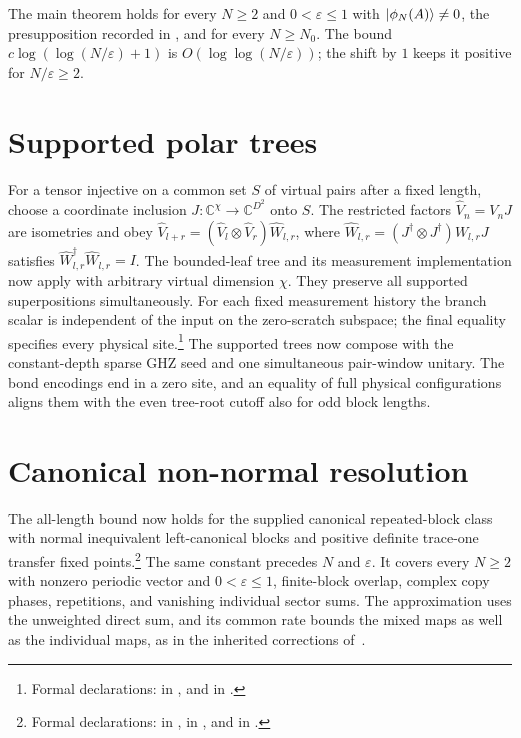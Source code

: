 \documentclass{article}
\begin{document}
The main theorem holds for every $N\ge2$ and $0<\varepsilon\le1$ with
$|\phi_N(A)\rangle\neq0$, the presupposition recorded in
, and for every
$N\ge N_0$.
The bound $c\log(\log(N/\varepsilon)+1)$ is $O(\log\log(N/\varepsilon))$; the
shift by $1$ keeps it positive for $N/\varepsilon\ge2$.

\section{Supported polar trees}
For a tensor injective on a common set $S$ of virtual pairs after a fixed
length, choose a coordinate inclusion $J\colon\mathbb C^\chi\to\mathbb C^{D^2}$
onto $S$. The restricted factors $\widehat V_n=V_nJ$ are isometries and obey
$\widehat V_{l+r}=(\widehat V_l\otimes\widehat V_r)\widehat W_{l,r}$, where
$\widehat W_{l,r}=(J^\dagger\otimes J^\dagger)W_{l,r}J$ satisfies
$\widehat W_{l,r}^\dagger\widehat W_{l,r}=I$.
The bounded-leaf tree and its measurement implementation now apply with
arbitrary virtual dimension $\chi$. They preserve all supported
superpositions simultaneously. For each fixed measurement history the
branch scalar is independent of the input on the zero-scratch subspace;
the final equality specifies every physical site.\footnote{Formal declarations:
     in
    , and
     in
    .}
The supported trees now compose with the constant-depth sparse GHZ seed
and one simultaneous pair-window unitary. The bond encodings end in a zero
site, and an equality of full physical configurations aligns them with the
even tree-root cutoff also for odd block lengths.

\section{Canonical non-normal resolution}
The all-length bound now holds for the supplied canonical repeated-block
class with normal inequivalent left-canonical blocks and positive definite
trace-one transfer fixed points.\footnote{Formal declarations:
     in
    ,
     in
    , and
    in .}
The same constant precedes $N$ and $\varepsilon$. It covers every $N\ge2$
with nonzero periodic vector and $0<\varepsilon\le1$, finite-block overlap,
complex copy phases, repetitions, and vanishing individual sector sums.
The approximation uses the unweighted direct sum, and its common rate
bounds the mixed maps as well as the individual maps, as in the inherited
corrections of~\cite{gap:mswc24_block_form_mixed_overlap}.
\end{document}

